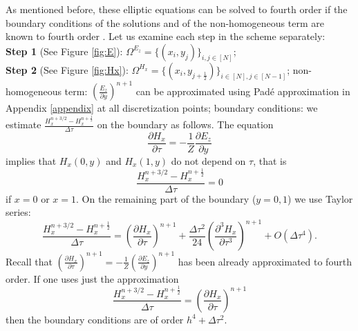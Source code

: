 \documentclass[12pt,reqno]{amsart}
\theoremstyle{definition}
\numberwithin{equation}{section}
\def\Gw{\Omega}     \def\Gx{\Xi}         \def\Gy{\Psi}
\begin{document}
	As mentioned before, these  elliptic equations  can be solved  to fourth order   if the boundary conditions of the solutions and of the non-homogeneous term are known to fourth order \cite{singer_turkel}.
	Let us examine each step in the scheme separately:\\[1mm]
	{\bf Step 1 } (See Figure \ref{fig:E}):  	$\Gw^{E_z}=\{(x_i,y_j)\}_{i,j\in [N]}$;
\\[1mm]
	{\bf Step 2} (See Figure \ref{fig:Hx}): 
 $\Gw^{H_x}=\{(x_i,y_{j+\frac{1}{2}})\}_{i\in [N],j\in [N-1]}$; 
	non-homogeneous term:  
	$\left (\frac{E_z}{\partial y}\right)^{n+1} $
	can be approximated  using Pad\'e approximation  in Appendix \ref{appendix} at all discretization points;
	boundary conditions:
	we  estimate 
	$\frac{H_x^{n+3/2}-H_x^{n+\frac{1}{2}}}{\Delta \tau}$ on the boundary as follows.
	The equation  
	$$
	\frac{\partial H_x}{\partial \tau}=-\frac{1}{Z}\frac{\partial E_z}{\partial y}
	$$
	implies that $H_x(0,y)$ and $H_x(1,y)$ do not depend on $\tau$, that is 
	$$\frac{H_x^{n+3/2}-H_x^{n+\frac{1}{2}}}{\Delta \tau}=0$$ if $x=0$ or $x=1$.
	On the remaining part of the boundary ($y=0,1$)  we use Taylor series:
	$$
	\frac{	H_x^{n+3/2}-H_x^{n+\frac{1}{2}}}{\Delta \tau}=
	\left(\frac{\partial H_x}{\partial \tau}\right)^{n+1}+
	\frac{\Delta \tau^2}{24}\left(\frac{\partial^3 H_x}{\partial \tau^3}\right)^{n+1}+O(\Delta \tau^4).
	$$
	Recall that
	$\left(\frac{\partial H_x}{\partial \tau}\right)^{n+1}=-\frac{1}{Z}\left(\frac{\partial E_z}{\partial y}\right)^{n+1}$ has been already approximated to fourth order. 
	If one uses just the approximation 
	$$
	\frac{	H_x^{n+3/2}-H_x^{n+\frac{1}{2}}}{\Delta \tau}=
	\left(\frac{\partial H_x}{\partial \tau}\right)^{n+1}
	$$
	then the boundary conditions are of order $h^4+\Delta \tau^2$.
	
\end{document}
